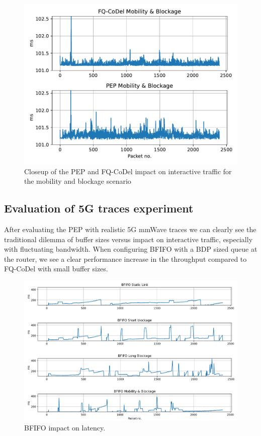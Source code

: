 \documentclass[a4paper,english, 11pt]{report}
\begin{document}
\begin{figure}[!h!] %
	\centering
	\includegraphics[scale=0.70]{../diagrams/witestlab/throughput/latency_mobb_closeup.pdf}
  	\caption{Closeup of the PEP and FQ-CoDel impact on interactive traffic for the mobility and blockage scenario}
  	\label{fig:throughput_latency_closeup_mobb}
\end{figure}

\subsection{Evaluation of 5G traces experiment}
After evaluating the PEP with realistic 5G mmWave traces we can clearly see the traditional dilemma of buffer sizes versus impact on interactive traffic, especially with fluctuating bandwidth. When configuring BFIFO with a BDP sized queue at the router, we see a clear performance increase in the throughput compared to FQ-CoDel with small buffer sizes.\\

\begin{figure}[!h!] %
	\centering
	\includegraphics[scale=0.45]{../diagrams/witestlab/throughput/latency_bfifo_all.png}
  	\caption{BFIFO impact on latency.}
  	\label{fig:throughput_all_latency_bfifo}
\end{figure}
\end{document}
